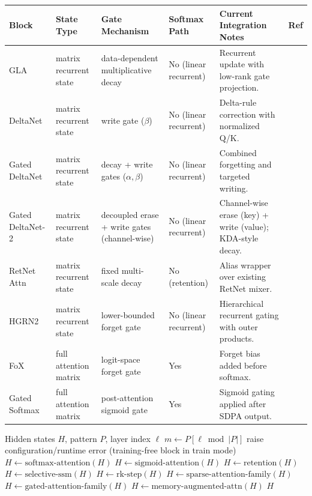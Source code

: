 \documentclass[11pt,a4paper]{article}
\begin{document}
\small
\begin{longtable}{p{2.4cm}p{2.0cm}p{2.2cm}p{1.8cm}p{4.0cm}p{1.5cm}}
\toprule
\textbf{Block} & \textbf{State Type} & \textbf{Gate Mechanism} & \textbf{Softmax Path} & \textbf{Current Integration Notes} & \textbf{Ref} \\
\midrule
\endhead
GLA & matrix recurrent state & data-dependent multiplicative decay & No (linear recurrent) & Recurrent update with low-rank gate projection. & \citep{yang_gla_2023} \\
DeltaNet & matrix recurrent state & write gate ($\beta$) & No (linear recurrent) & Delta-rule correction with normalized Q/K. & \citep{yang_deltanet_2024} \\
Gated DeltaNet & matrix recurrent state & decay + write gates ($\alpha,\beta$) & No (linear recurrent) & Combined forgetting and targeted writing. & \citep{yang_gated_deltanet_2024} \\
Gated DeltaNet-2 & matrix recurrent state & decoupled erase + write gates (channel-wise) & No (linear recurrent) & Channel-wise erase (key) + write (value); KDA-style decay. & \citep{hatamizadeh_gated_deltanet2_2026} \\
RetNet Attn & matrix recurrent state & fixed multi-scale decay & No (retention) & Alias wrapper over existing RetNet mixer. & \citep{sun_retentive_2023} \\
HGRN2 & matrix recurrent state & lower-bounded forget gate & No (linear recurrent) & Hierarchical recurrent gating with outer products. & \citep{qin_hgrn2_2024} \\
FoX & full attention matrix & logit-space forget gate & Yes & Forget bias added before softmax. & \citep{lin_forgetting_transformer_2025} \\
Gated Softmax & full attention matrix & post-attention sigmoid gate & Yes & Sigmoid gating applied after SDPA output. & \citep{qiu_gated_attention_2025} \\
\bottomrule
\end{longtable}
\normalsize

\begin{algorithm}[t]
\caption{Pattern-Driven Mixer Forward (Conceptual)}
\begin{algorithmic}[1]
\Require Hidden states $H$, pattern $P$, layer index $\ell$
\State $m \gets P[\ell \bmod |P|]$
    \State raise configuration/runtime error (training-free block in train mode)
    \State $H \gets \text{softmax-attention}(H)$
    \State $H \gets \text{sigmoid-attention}(H)$
    \State $H \gets \text{retention}(H)$
    \State $H \gets \text{selective-ssm}(H)$
    \State $H \gets \text{rk-step}(H)$
    \State $H \gets \text{sparse-attention-family}(H)$
    \State $H \gets \text{gated-attention-family}(H)$
\Else
    \State $H \gets \text{memory-augmented-attn}(H)$
\EndIf
\State \Return $H$
\end{algorithmic}
\end{algorithm}
\end{document}
